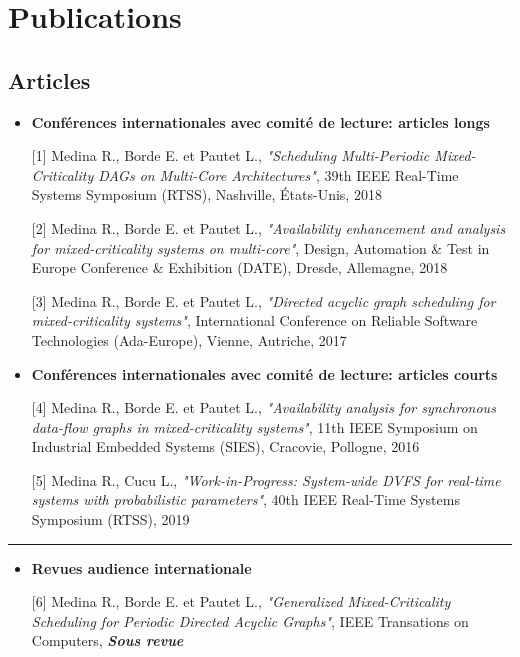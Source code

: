 \documentclass{article}
\begin{document}

\section{Publications}

\subsection{Articles}

\begin{itemize}
	\item \textbf{Conférences internationales avec comité de lecture: articles longs}
	
	[1] Medina R., Borde E. et Pautet L.,  \textit{"Scheduling Multi-Periodic Mixed-Criticality DAGs on 
	Multi-Core Architectures"}, 39th IEEE Real-Time Systems Symposium (RTSS), Nashville, États-Unis, 2018

	[2] Medina R., Borde E. et Pautet L.,  \textit{"Availability enhancement and analysis for mixed-criticality 
	systems on multi-core"}, Design, Automation \& Test in Europe Conference \& Exhibition (DATE), Dresde, 
	Allemagne, 2018
	
	[3] Medina R., Borde E. et Pautet L.,  \textit{"Directed acyclic graph scheduling for mixed-criticality 
	systems"}, International Conference on Reliable Software Technologies (Ada-Europe), Vienne, Autriche, 
	2017
	
	\item \textbf{Conférences internationales avec comité de lecture: articles courts}
	
	[4] Medina R., Borde E. et Pautet L.,  \textit{"Availability analysis for synchronous data-flow graphs in 
	mixed-criticality systems"}, 11th IEEE Symposium on Industrial Embedded Systems (SIES), Cracovie, 
	Pollogne, 	2016
	
	[5] Medina R., Cucu L.,  \textit{"Work-in-Progress: System-wide DVFS for real-time
systems with 
	probabilistic parameters"}, 40th IEEE Real-Time Systems Symposium (RTSS), 2019
	
\end{itemize}

\rule{\textwidth}{0.4pt}

\begin{itemize}
	\item \textbf{Revues audience internationale}
	
	[6] Medina R., Borde E. et Pautet L.,  \textit{"Generalized Mixed-Criticality Scheduling for Periodic 
	Directed Acyclic Graphs"}, IEEE Transations on Computers, \textbf{\textit{Sous revue}}
	
\end{itemize}
\end{document}
